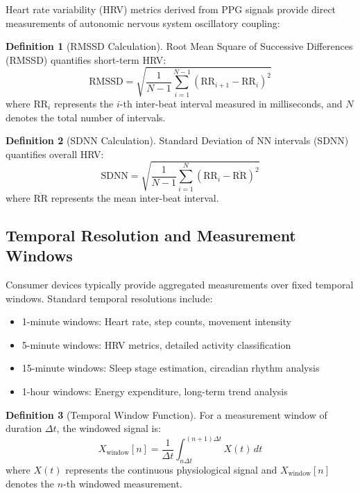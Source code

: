 \documentclass[12pt,a4paper]{article}
\theoremstyle{definition}
\newtheorem{definition}{Definition}[section]
\begin{document}
Heart rate variability (HRV) metrics derived from PPG signals provide direct measurements of autonomic nervous system oscillatory coupling:

\begin{definition}[RMSSD Calculation]
Root Mean Square of Successive Differences (RMSSD) quantifies short-term HRV:
\begin{equation}
\text{RMSSD} = \sqrt{\frac{1}{N-1} \sum_{i=1}^{N-1} (\text{RR}_{i+1} - \text{RR}_i)^2}
\end{equation}
where $\text{RR}_i$ represents the $i$-th inter-beat interval measured in milliseconds, and $N$ denotes the total number of intervals.
\end{definition}

\begin{definition}[SDNN Calculation]
Standard Deviation of NN intervals (SDNN) quantifies overall HRV:
\begin{equation}
\text{SDNN} = \sqrt{\frac{1}{N-1} \sum_{i=1}^{N} (\text{RR}_i - \overline{\text{RR}})^2}
\end{equation}
where $\overline{\text{RR}}$ represents the mean inter-beat interval.
\end{definition}

\subsection{Temporal Resolution and Measurement Windows}

Consumer devices typically provide aggregated measurements over fixed temporal windows. Standard temporal resolutions include:

\begin{itemize}
\item 1-minute windows: Heart rate, step counts, movement intensity
\item 5-minute windows: HRV metrics, detailed activity classification
\item 15-minute windows: Sleep stage estimation, circadian rhythm analysis
\item 1-hour windows: Energy expenditure, long-term trend analysis
\end{itemize}

\begin{definition}[Temporal Window Function]
For a measurement window of duration $\Delta t$, the windowed signal is:
\begin{equation}
X_{\text{window}}[n] = \frac{1}{\Delta t} \int_{n\Delta t}^{(n+1)\Delta t} X(t) \, dt
\end{equation}
where $X(t)$ represents the continuous physiological signal and $X_{\text{window}}[n]$ denotes the $n$-th windowed measurement.
\end{definition}
\end{document}
